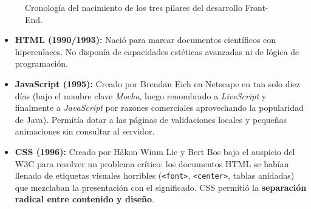 \begin{figure}[htbp]
\centering
{}
\caption{Cronología del nacimiento de los tres pilares del desarrollo Front-End.}
\label{fig:trinidad-cronologia}
\end{figure}

\begin{itemize}[leftmargin=1.2cm]
  \item \textbf{HTML (1990/1993):} Nació para marcar documentos científicos con hiperenlaces. No disponía de capacidades estéticas avanzadas ni de lógica de programación.
  \item \textbf{JavaScript (1995):} Creado por Brendan Eich en Netscape en tan solo diez días (bajo el nombre clave \textit{Mocha}, luego renombrado a \textit{LiveScript} y finalmente a \textit{JavaScript} por razones comerciales aprovechando la popularidad de Java). Permitía dotar a las páginas de validaciones locales y pequeñas animaciones sin consultar al servidor.
  \item \textbf{CSS (1996):} Creado por Håkon Wium Lie y Bert Bos bajo el auspicio del W3C para resolver un problema crítico: los documentos HTML se habían llenado de etiquetas visuales horribles (\texttt{<font>}, \texttt{<center>}, tablas anidadas) que mezclaban la presentación con el significado. CSS permitió la \textbf{separación radical entre contenido y diseño}.
\end{itemize}
